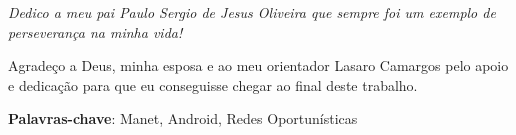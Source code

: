 \documentclass[12pt, %
openright, 
oneside,
a4paper,
brazil]{facom-ufu-abntex2}
\begin{document}
\begin{dedicatoria}
   \vspace*{\fill}
   \centering
   \noindent
   \textit{Dedico a meu pai Paulo Sergio de Jesus Oliveira que sempre foi um exemplo de perseverança na minha vida!}  %
   \vspace*{\fill}
\end{dedicatoria}

\begin{agradecimentos}
Agradeço a Deus, minha esposa e ao meu orientador Lasaro Camargos pelo apoio e dedicação para que eu conseguisse chegar ao final deste trabalho. %
\end{agradecimentos}




\begin{resumo} %

 \vspace{\onelineskip}
    
 \noindent
 \textbf{Palavras-chave}: Manet, Android, Redes Oportunísticas%
\end{resumo}

\listoffigures*
\cleardoublepage

\listoftables*
\cleardoublepage




\end{document}
